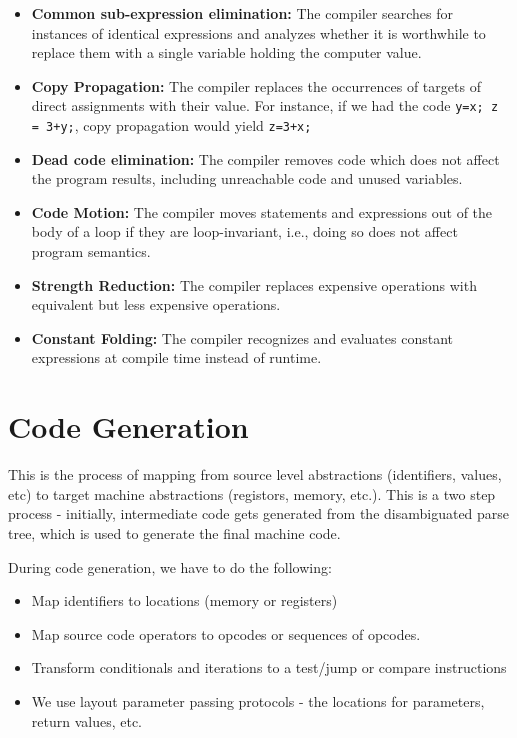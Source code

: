 \documentclass[12pt,letterpaper]{book}
\theoremstyle{definition}
\begin{document}
\begin{itemize}
  \item \textbf{Common sub-expression elimination:} The compiler searches for instances of identical expressions and analyzes whether it is worthwhile to replace them with a single variable holding the computer value.
  \item \textbf{Copy Propagation:} The compiler replaces the occurrences of targets of direct assignments with their value. For instance, if we had the code \texttt{y=x; z = 3+y;}, copy propagation would yield \texttt{z=3+x;}
  \item \textbf{Dead code elimination:} The compiler removes code which does not affect the program results, including unreachable code and unused variables.
  \item \textbf{Code Motion:} The compiler moves statements and expressions out of the body of a loop if they are loop-invariant, i.e., doing so does not affect program semantics.
  \item \textbf{Strength Reduction:} The compiler replaces expensive operations with equivalent but less expensive operations.
  \item \textbf{Constant Folding:} The compiler recognizes and evaluates constant expressions at compile time instead of runtime.
\end{itemize}

\section{Code Generation}

This is the process of mapping from source level abstractions (identifiers, values, etc) to target machine abstractions (registors, memory, etc.). This is a two step process - initially, intermediate code gets generated from the disambiguated parse tree, which is used to generate the final machine code.

During code generation, we have to do the following:

\begin{itemize}
  \item Map identifiers to locations (memory or registers)
  \item Map source code operators to opcodes or sequences of opcodes.
  \item Transform conditionals and iterations to a test/jump or compare instructions
  \item We use layout parameter passing protocols - the locations for parameters, return values, etc.
\end{itemize}
\end{document}
